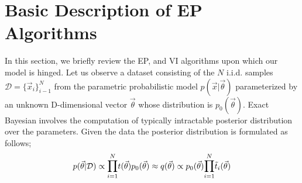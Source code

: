 \documentclass[]{article}
\begin{document}
\section{Basic Description of EP Algorithms}
In this section, we briefly review the EP, and VI algorithms upon which our model is hinged. Let us observe a dataset consisting of the $N$ i.i.d. samples $\mathcal{D} = \{\vec{x}_i\}_{i-1}^N$ from the parametric probabilistic model $p(\vec{x}|\vec{\theta})$ parameterized by an unknown D-dimensional vector $\vec{\theta}$ whose distribution is $p_0(\vec{\theta})$. Exact Bayesian involves the computation of typically intractable posterior distribution over the parameters. Given the data the posterior distribution is formulated as follows;
\begin{equation}
	p(\vec{\theta}|\mathcal{D}) \propto \mathlarger \prod_{i=1}^N t(\vec{\theta}) p_0(\vec{\theta}) \approx q(\vec{\theta}) \propto p_0(\vec{\theta}) \mathlarger \prod_{i=1}^N \tilde{t}_i(\vec{\theta})
	\label{equ:1}
\end{equation}
\end{document}
